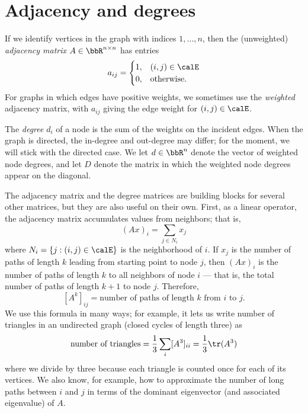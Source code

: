 \documentclass[12pt, leqno]{article} %
\begin{document}
\section{Adjacency and degrees}


If we identify vertices in the graph with indices $1, \ldots, n$, then
the (unweighted) {\em adjacency matrix} $A \in \bbR^{n \times n}$ has entries
\[
  a_{ij} =
  \begin{cases}
    1, & (i,j) \in \calE \\
    0, & \mbox{otherwise}.
  \end{cases}
\]
For graphs in which edges have positive weights, we sometimes use the
{\em weighted} adjacency matrix, with $a_{ij}$ giving the edge weight
for $(i,j) \in \calE$.

The {\em degree} $d_i$ of a node is the sum of the weights on the
incident edges.  When the graph is directed, the in-degree and
out-degree may differ; for the moment, we will stick with the directed
case.  We let $d \in \bbR^n$ denote the vector of weighted node
degrees, and let $D$ denote the matrix in which the weighted node
degrees appear on the diagonal.

The adjacency matrix and the degree matrices are building blocks for
several other matrices, but they are also useful on their own.
First, as a linear operator, the adjacency matrix accumulates values
from neighbors; that is,
\[
  (Ax)_i = \sum_{j \in N_i} x_j
\]
where $N_i = \{ j : (i,j) \in \calE \}$ is the neighborhood of $i$.
If $x_j$ is the number of paths of length $k$ leading from starting
point to node $j$, then $(Ax)_i$ is the number of paths of length $k$
to all neighbors of node $i$ --- that is, the total number of paths of
length $k+1$ to node $j$.  Therefore,
\[
  [A^k]_{ij} = \mbox{number of paths of length $k$ from $i$ to $j$}.
\]
We use this formula in many ways; for example, it lets us
write number of triangles in an undirected graph (closed
cycles of length three) as
\[
  \mbox{number of triangles}
    = \frac{1}{3} \sum_{i} [A^3]_{ii}
    = \frac{1}{3} \tr(A^3)
\]
where we divide by three because each triangle is counted once for
each of its vertices.  We also know, for example, how to approximate
the number of long paths between $i$ and $j$ in terms of the dominant
eigenvector (and associated eigenvalue) of $A$.
\end{document}
